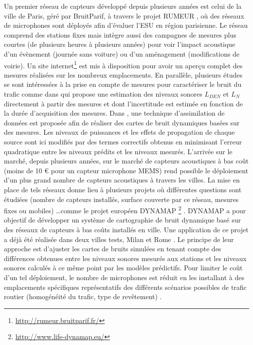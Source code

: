 Un premier réseau de capteurs développé depuis plusieurs années est celui de la ville de Paris, géré par BruitParif, à travers le projet RUMEUR \cite{mietlicki2012innovative}, où des réseaux de microphones sont déployés afin d'évaluer l'ESU en région parisienne. Le réseau comprend des stations fixes mais intègre aussi des campagnes de mesures plus courtes (de plusieurs heures à plusieurs années) pour voir l'impact acoustique d'un évènement (journée sans voiture) ou d'un aménagement (modifications de voirie). Un site internet\footnote{\url{http://rumeur.bruitparif.fr/}} est mis à disposition pour avoir un aperçu complet des mesures réalisées sur les nombreux emplacements.
En parallèle, plusieurs études se sont intéressées à la prise en compte de mesures pour caractériser le bruit du trafic comme dans \cite{makarewicz_empirical_2011} qui propose une estimation des niveaux sonores $L_{DEN}$ et $L_N$ directement à partir des mesures et dont l'incertitude est estimée en fonction de la durée d'acquisition des mesures. Dans \cite{wei_dynamic_2016}, une technique d'assimilation de données est proposée afin de réaliser des cartes de bruit dynamiques basées sur des mesures. Les niveaux de puissances et les effets de propagation de chaque source sont ici modifiés par des termes correctifs obtenus en minimisant l'erreur quadratique entre les niveaux prédits et les niveaux mesurés.
L'arrivée sur le marché, depuis plusieurs années, sur le marché de capteurs acoustiques à bas coût (moins de 10 € pour un capteur microphone MEMS) \cite{van2010use} rend possible le déploiement d'un plus grand nombre de capteurs acoustiques à travers les villes. La mise en place de tels réseaux donne lieu à plusieurs projets où différentes questions sont étudiées (nombre de capteurs installés, surface couverte par ce réseau, mesures fixes ou mobiles) \dots comme le projet européen DYNAMAP \footnote{\url{http://www.life-dynamap.eu/}} \cite{dynamap_2016}. DYNAMAP a pour objectif de développer un système de cartographie de bruit dynamique basé sur des réseaux de capteurs à bas coûts installés en ville. Une application de ce projet a déjà été réalisée dans deux villes tests, Milan et Rome \cite{bellucci_life_2017}.
Le principe de leur approche est d'ajuster les cartes de bruits simulées en tenant compte des différences obtenues entre les niveaux sonores mesurés aux stations et les niveaux sonores calculés à ce même point par les modèles prédictifs. Pour limiter le coût d'un tel déploiement, le nombre de microphones est réduit en les installant à des emplacements spécifiques représentatifs des différents scénarios possibles de trafic routier (homogénéité du trafic, type de revêtement) \cite{zambon2017life}.
